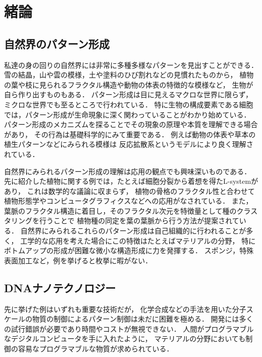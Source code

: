 \chapter{緒論}

\section{自然界のパターン形成}
私達の身の回りの自然界には非常に多種多様なパターンを見出すことができる．
雪の結晶，山や雲の模様，土や塗料のひび割れなどの見慣れたものから，
植物の葉や枝に見られるフラクタル構造や動物の体表の特徴的な模様など，
生物が自ら作り出すものもある．
パターン形成は目に見えるマクロな世界に限らず，
ミクロな世界でも至るところで行われている．
特に生物の構成要素である細胞では，パターン形成が生命現象に深く関わっていることがわかり始めている．
パターン形成のメカニズムを探ることでその現象の原理や本質を理解できる場合があり，
その行為は基礎科学的にみて重要である．
例えば動物の体表や草本の植生パターンなどにみられる模様は
反応拡散系というモデルにより良く理解されている\cite{turing1990chemical}．

自然界にみられるパターン形成の理解は応用の観点でも興味深いものである．
先に紹介した植物に関する例では，たとえば細胞分裂から着想を得たL-system\cite{lindenmayer1968mathematical}があり，
これは数学的な議論に収まらず，
植物の骨格のフラクタル性と合わせて
植物形態学やコンピュータグラフィクスなどへの応用がなされている\cite{aono1984botanical}．
また，葉脈のフラクタル構造に着目し，そのフラクタル次元を特徴量として種のクラスタリングを行うことで
植物種の同定を葉の葉脈から行う方法が提案されている\cite{bruno2008fractal}．
自然界にみられるこれらのパターン形成は自己組織的に行われることが多く，
工学的な応用を考えた場合にこの特徴はたとえばマテリアルの分野，
特にボトムアップの形成が困難な微小な構造形成に力を発揮する．
スポンジ，特殊表面加工など，例を挙げると枚挙に暇がない．
%


\section{DNAナノテクノロジー}
先に挙げた例はいずれも重要な技術だが，
化学合成などの手法を用いた分子スケールの物質の制御によるパターン制御は未だに困難を極める．
開発には多くの試行錯誤が必要であり時間やコストが無視できない．
人間がプログラマブルなデジタルコンピュータを手に入れたように，
マテリアルの分野においても制御の容易なプログラマブルな物質が求められている．

